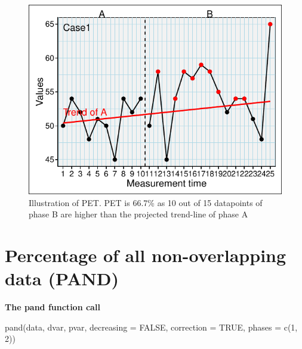 \documentclass[
  letterpaper,
  DIV=11,
  numbers=noendperiod]{scrreprt}
\begin{document}
\begin{figure}

{\centering \includegraphics{./ch_overlapping_indices_files/figure-pdf/unnamed-chunk-16-1.pdf}

}

\caption{Illustration of PET. PET is 66.7\% as 10 out of 15 datapoints
of phase B are higher than the projected trend-line of phase A}

\end{figure}

\hypertarget{percentage-of-all-non-overlapping-data-pand}{%
\section{Percentage of all non-overlapping data
(PAND)}\label{percentage-of-all-non-overlapping-data-pand}}

\begin{tcolorbox}[enhanced jigsaw, breakable, rightrule=.15mm, bottomrule=.15mm, arc=.35mm, colback=white, colframe=quarto-callout-tip-color-frame, opacityback=0, leftrule=.75mm, toprule=.15mm, left=2mm]
\begin{minipage}[t]{5.5mm}
\textcolor{quarto-callout-tip-color}{\faLightbulb}
\end{minipage}%
\begin{minipage}[t]{\textwidth - 5.5mm}

\textbf{The pand function call}\vspace{2mm}

pand(data, dvar, pvar, decreasing = FALSE, correction = TRUE, phases =
c(1, 2))

\end{minipage}%
\end{tcolorbox}
\end{document}

